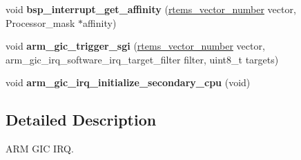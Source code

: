 \begin{DoxyCompactItemize}
void {\bfseries bsp\+\_\+interrupt\+\_\+get\+\_\+affinity} (\mbox{\hyperlink{group__ClassicINTR_ga3e434c197d99f128e78cae4d9358bd8b}{rtems\+\_\+vector\+\_\+number}} vector, Processor\+\_\+mask $\ast$affinity)
\item 
\mbox{\label{arm-gic-irq_8h_ad1930ccb2070887169d1f9db5ac8bb01}} 
void {\bfseries arm\+\_\+gic\+\_\+trigger\+\_\+sgi} (\mbox{\hyperlink{group__ClassicINTR_ga3e434c197d99f128e78cae4d9358bd8b}{rtems\+\_\+vector\+\_\+number}} vector, arm\+\_\+gic\+\_\+irq\+\_\+software\+\_\+irq\+\_\+target\+\_\+filter filter, uint8\+\_\+t targets)
\item 
\mbox{\label{arm-gic-irq_8h_ae3114dc46f8625e8a6d6663981ff2b4c}} 
void {\bfseries arm\+\_\+gic\+\_\+irq\+\_\+initialize\+\_\+secondary\+\_\+cpu} (void)
\end{DoxyCompactItemize}


\subsection{Detailed Description}
A\+RM G\+IC I\+RQ. 

